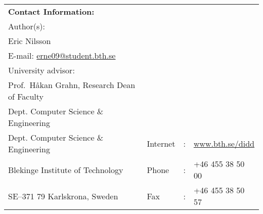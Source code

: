 {%
\noindent%
\begin{tabular}{p{}lcl}
\textbf{Contact Information:}\\
Author(s):\\
Eric Nilsson\\
E-mail: \href{mailto:erne09@student.bth.se}{erne09@student.bth.se} \\ %
\par\vspace {5cm}
University advisor:\\
Prof.\ Håkan Grahn, Research Dean of Faculty\\
Dept. Computer Science \& Engineering

\par\vspace {1cm}

\noindent%
 \\
Dept. Computer Science \& Engineering & Internet & : & \href{http://www.bth.se/didd}{www.bth.se/didd}\\
Blekinge Institute of Technology & Phone	& : & +46 455 38 50 00 \\
SE--371 79 Karlskrona, Sweden & Fax & : & +46 455 38 50 57 \\
\end{tabular}
\clearpage
} %

\setcounter{page}{1}

